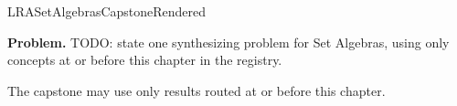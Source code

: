 \ifcsname LRASetAlgebrasCapstoneRendered\endcsname
\else
\expandafter\gdef\csname LRASetAlgebrasCapstoneRendered\endcsname{}

\newpage
{}
\label{cap:set-algebras}

\begin{tcolorbox}[
  colback=gray!6,
  colframe=gray!40,
  arc=2pt,
  left=8pt, right=8pt, top=6pt, bottom=6pt,
  title={\small\textbf{Capstone Problem}},
  fonttitle=\small\bfseries
]
\textbf{Problem.}
TODO: state one synthesizing problem for Set Algebras, using only concepts at or
before this chapter in the registry.
\end{tcolorbox}

\begin{remark*}
The capstone may use only results routed at or before this chapter.
\end{remark*}

\clearpage
\fi
